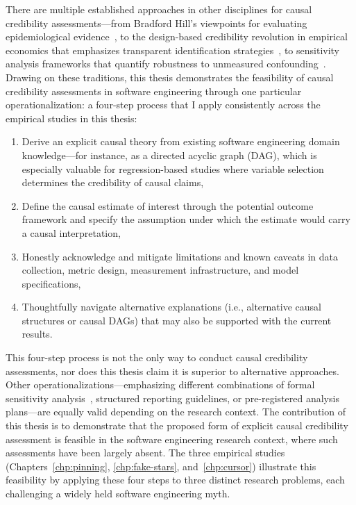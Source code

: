 There are multiple established approaches in other disciplines for causal credibility assessments---from Bradford Hill's viewpoints for evaluating epidemiological evidence~\cite{hill1965environment}, to the design-based credibility revolution in empirical economics that emphasizes transparent identification strategies~\cite{angrist2010credibility}, to sensitivity analysis frameworks that quantify robustness to unmeasured confounding~\cite{rosenbaum2002observational}.
Drawing on these traditions, this thesis demonstrates the feasibility of causal credibility assessments in software engineering through one particular operationalization: a four-step process that I apply consistently across the empirical studies in this thesis:
\begin{enumerate}[leftmargin=20pt]
    \item Derive an explicit causal theory from existing software engineering domain knowledge---for instance, as a directed acyclic graph (DAG), which is especially valuable for regression-based studies where variable selection determines the credibility of causal claims,
    \item Define the causal estimate of interest through the potential outcome framework and specify the assumption under which the estimate would carry a causal interpretation,
    \item Honestly acknowledge and mitigate limitations and known caveats in data collection, metric design, measurement infrastructure, and model specifications, 
    \item Thoughtfully navigate alternative explanations (i.e., alternative causal structures or causal DAGs) that may also be supported with the current results. 
\end{enumerate}
This four-step process is not the only way to conduct causal credibility assessments, nor does this thesis claim it is superior to alternative approaches.
Other operationalizations---emphasizing different combinations of formal sensitivity analysis~\cite{rosenbaum2002observational, vanderweele2017sensitivity}, structured reporting guidelines, or pre-registered analysis plans---are equally valid depending on the research context.
The contribution of this thesis is to demonstrate that the proposed form of explicit causal credibility assessment is feasible in the software engineering research context, where such assessments have been largely absent.
The three empirical studies (Chapters~\ref{chp:pinning}, \ref{chp:fake-stars}, and~\ref{chp:cursor}) illustrate this feasibility by applying these four steps to three distinct research problems, each challenging a widely held software engineering myth.

